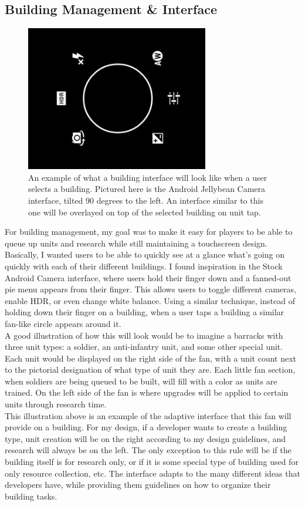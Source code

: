 \documentclass[11pt]{article}
\begin{document}
	\subsection{Building Management \& Interface}
	\begin{figure}[!ht]
	\begin{center}
	\includegraphics[height = 2.5in]{android-camera}
	\caption{An example of what a building interface will look like when a user selects a building. Pictured here is the Android Jellybean Camera interface, tilted 90 degrees to the left. An interface similar to this one will be overlayed on top of the selected building on unit tap.}
	\end{center}
	\end{figure}
	For building management, my goal was to make it easy for players to be able to queue up units and research while still maintaining a touchscreen design. Basically, I wanted users to be able to quickly see at a glance what's going on quickly with each of their different buildings. I found inspiration in the Stock Android Camera interface, where users hold their finger down and a fanned-out pie menu appears from their finger. This allows users to toggle different cameras, enable HDR, or even change white balance. Using a similar technique, instead of holding down their finger on a building, when a user taps a building a similar fan-like circle appears around it. \\
	\indent A good illustration of how this will look would be to imagine a barracks with three unit types: a soldier, an anti-infantry unit, and some other special unit. Each unit would be displayed on the right side of the fan, with a unit count next to the pictorial designation of what type of unit they are. Each little fan section, when soldiers are being queued to be built, will fill with a color as units are trained. On the left side of the fan is where upgrades will be applied to certain units through research time. \\
	\indent This illustration above is an example of the adaptive interface that this fan will provide on a building. For my design, if a developer wants to create a building type, unit creation will be on the right according to my design guidelines, and research will always be on the left. The only exception to this rule will be if the building itself is for research only, or if it is some special type of building used for only resource collection, etc. The interface adapts to the many different ideas that developers have, while providing them guidelines on how to organize their building tasks.
\end{document}
